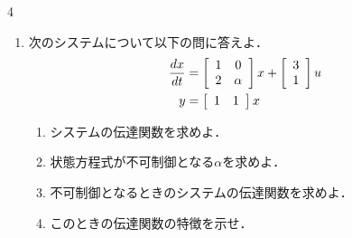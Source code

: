\begin{multicols}{4}
\begin{enumerate}

\vfill\null
\columnbreak

\vspace*{4cm}
\item
次のシステムについて以下の問に答えよ．
\begin{align}
	\frac{dx}{dt}
	&=	\bmatrix{cc}
			1 & 0 \\
			2 & \alpha
		\ematrix
		x
		+
		\bmatrix{c}
			3 \\
			1 
		\ematrix
		u
\nonumber \\
	y 
	&=	\bmatrix{cc}
			1 & 1 
		\ematrix
		x
\nonumber 
\end{align}

\begin{enumerate}

\item 
システムの伝達関数を求めよ．
\vspace{5cm}

\item
状態方程式が不可制御となる$\alpha$を求めよ．
\vspace{4cm}

\item
不可制御となるときのシステムの伝達関数を求めよ．
\vspace{4cm}

\item
このときの伝達関数の特徴を示せ．


\end{enumerate}
\end{enumerate}
\end{multicols}



